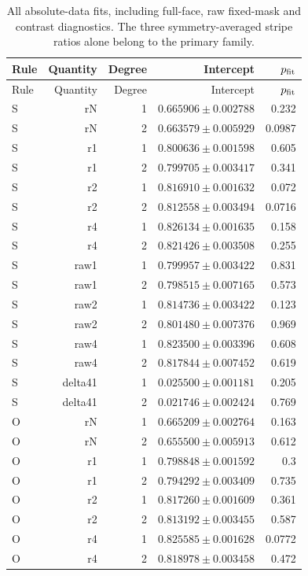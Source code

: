 {\small\setlength{\tabcolsep}{3.5pt}
\begin{longtable}{lrrrr}
\caption{All absolute-data fits, including full-face, raw fixed-mask and contrast diagnostics. The three symmetry-averaged stripe ratios alone belong to the primary family.}\\
\toprule
Rule & Quantity & Degree & Intercept & $p_{\rm fit}$\\
\midrule
\endfirsthead
\toprule
Rule & Quantity & Degree & Intercept & $p_{\rm fit}$\\
\midrule
\endhead
\bottomrule\endfoot
S & rN & 1 & $0.665906\pm0.002788$ & 0.232\\
S & rN & 2 & $0.663579\pm0.005929$ & 0.0987\\
S & r1 & 1 & $0.800636\pm0.001598$ & 0.605\\
S & r1 & 2 & $0.799705\pm0.003417$ & 0.341\\
S & r2 & 1 & $0.816910\pm0.001632$ & 0.072\\
S & r2 & 2 & $0.812558\pm0.003494$ & 0.0716\\
S & r4 & 1 & $0.826134\pm0.001635$ & 0.158\\
S & r4 & 2 & $0.821426\pm0.003508$ & 0.255\\
S & raw1 & 1 & $0.799957\pm0.003422$ & 0.831\\
S & raw1 & 2 & $0.798515\pm0.007165$ & 0.573\\
S & raw2 & 1 & $0.814736\pm0.003422$ & 0.123\\
S & raw2 & 2 & $0.801480\pm0.007376$ & 0.969\\
S & raw4 & 1 & $0.823500\pm0.003396$ & 0.608\\
S & raw4 & 2 & $0.817844\pm0.007452$ & 0.619\\
S & delta41 & 1 & $0.025500\pm0.001181$ & 0.205\\
S & delta41 & 2 & $0.021746\pm0.002424$ & 0.769\\
O & rN & 1 & $0.665209\pm0.002764$ & 0.163\\
O & rN & 2 & $0.655500\pm0.005913$ & 0.612\\
O & r1 & 1 & $0.798848\pm0.001592$ & 0.3\\
O & r1 & 2 & $0.794292\pm0.003409$ & 0.735\\
O & r2 & 1 & $0.817260\pm0.001609$ & 0.361\\
O & r2 & 2 & $0.813192\pm0.003455$ & 0.587\\
O & r4 & 1 & $0.825585\pm0.001628$ & 0.0772\\
O & r4 & 2 & $0.818978\pm0.003458$ & 0.472\\

\end{longtable}}
